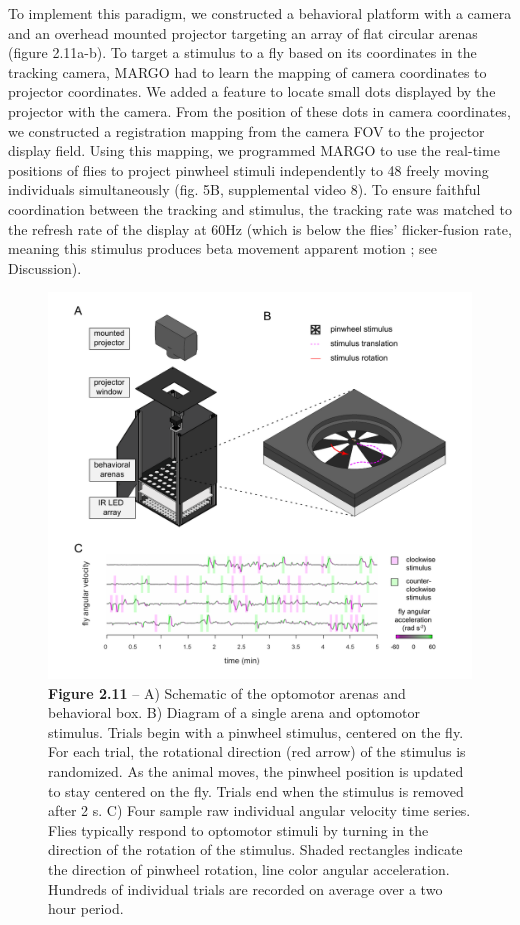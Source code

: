 \documentclass[12pt,letterpaper]{article}
\begin{document}
To implement this paradigm, we constructed a behavioral platform with a camera and an overhead mounted projector targeting an array of flat circular arenas (figure 2.11a-b). To target a stimulus to a fly based on its coordinates in the tracking camera, MARGO had to learn the mapping of camera coordinates to projector coordinates. We added a feature to locate small dots displayed by the projector with the camera. From the position of these dots in camera coordinates, we constructed a registration mapping from the camera FOV to the projector display field. Using this mapping, we programmed MARGO to use the real-time positions of flies to project pinwheel stimuli independently to 48 freely moving individuals simultaneously (fig. 5B, supplemental video 8). To ensure faithful coordination between the tracking and stimulus, the tracking rate was matched to the refresh rate of the display at 60Hz (which is below the flies' flicker-fusion rate, meaning this stimulus produces beta movement apparent motion \cite{haag_arenz_serbe_gabbiani_borst_2016}; see Discussion). 

\begin{figure}[t!]
 \includegraphics[width=\textwidth]{../figures/chapter_2/fig_2-11.pdf}
 \caption*{\textbf{Figure 2.11} -- A) Schematic of the optomotor arenas and behavioral box. B) Diagram of a single arena and optomotor stimulus. Trials begin with a pinwheel stimulus, centered on the fly. For each trial, the rotational direction (red arrow) of the stimulus is randomized. As the animal moves, the pinwheel position is updated to stay centered on the fly. Trials end when the stimulus is removed after 2 s. C) Four sample raw individual angular velocity time series. Flies typically respond to optomotor stimuli by turning in the direction of the rotation of the stimulus. Shaded rectangles indicate the direction of pinwheel rotation, line color angular acceleration. Hundreds of individual trials are recorded on average over a two hour period.}
\end{figure}
\end{document}
